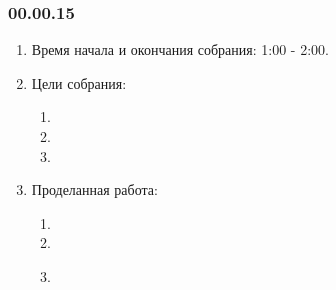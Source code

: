 \subsubsection{00.00.15}
\begin{enumerate}
	
	\item Время начала и окончания собрания: 1:00 - 2:00.
	
	\item Цели собрания: 
	\begin{enumerate}
		
		\item 
		
		\item 
		
        \item 
		
	\end{enumerate}

	\item Проделанная работа:
	\begin{enumerate}
		
		\item 
		
		\item 
		
        \item 
		
        \begin{figure}[H]
	  	  \begin{minipage}[h]{0.2\linewidth}
	  	    \center  
	  	  \end{minipage}
	  	  \begin{minipage}[h]{0.6\linewidth}
	  		\caption{}
	  	  \end{minipage}
	   \end{figure}


\end{enumerate}
\end{enumerate}
